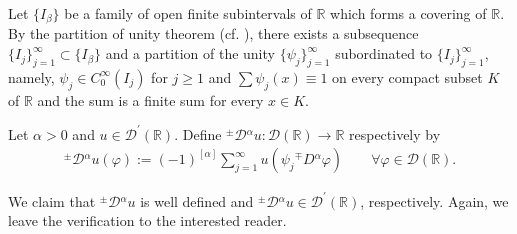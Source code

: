 \documentclass[leqno,final]{siamltex}
\numberwithin{equation}{section}
\renewcommand{\(}{\bigl(}
\renewcommand{\)}{\bigr)}
\newcommand{\R}{\mathbb{R}}
\begin{document}
Let $\{I_\beta\}$ be a family of open finite subintervals of $\R$ which forms a covering of $\R$. 
By the  partition of unity theorem (cf. \cite{Rudin}),  there exists a subsequence $\{I_j\}_{j =1}^{\infty} \subset \{I_\beta\}$ and a partition  of the unity $\{\psi_j\}_{j = 1}^{\infty}$
subordinated to $\{I_j\}_{j= 1}^{\infty}$, namely, $\psi_j\in C^\infty_0(I_j)$ 
for $j\geq 1$ and $\sum \psi_j(x)\equiv 1$ on every compact subset $K$ of $\R$ 
and the sum is a finite sum for every $x\in K$. 


	\begin{definition}\label{def-partition_R}
		Let $ \alpha >0$ and  $u \in  {\mathscr{D}}^\prime (\R) $. 
		Define ${^{\pm}}{\mathcal{D}}{^{\alpha}} u:  {\mathscr{D}}(\R) \to \R$ respectively by  
		\begin{align}\label{eq6.6}
		{^{\pm}}{\mathcal{D}}{^{\alpha}} u  (\varphi):=  
		(-1)^{[\alpha]} \sum_{j = 1}^{\infty} u( \psi_j {^{\mp}}{D}{^{\alpha}} \varphi)   
		\qquad \forall \varphi \in  {\mathscr{D}}(\R) .
		\end{align}
		
		
	\end{definition} 

 We claim that ${^{\pm}}{\mathcal{D}}{^{\alpha}} u$ is well defined and ${^{\pm}}{\mathcal{D}}{^{\alpha}} u \in  {\mathscr{D}}^\prime (\R) $, respectively.
Again, we leave the verification to the interested reader.

\end{document}
